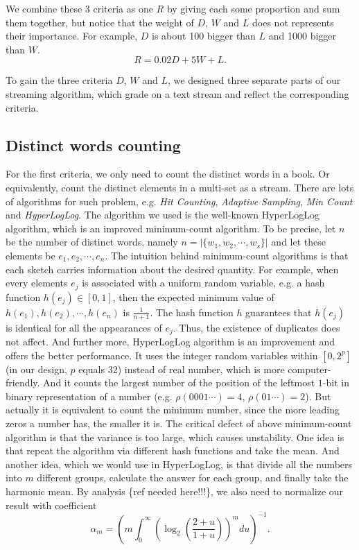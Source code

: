 \documentclass{article}
\begin{document}
	We combine these 3 criteria as one $R$ by giving each some proportion and sum them together, but notice that the weight of $D$, $W$ and $L$ does not represents their importance. For example, $D$ is about 100 bigger than $L$ and 1000 bigger than $W$.
	\[R = 0.02D + 5W + L.\]

	To gain the three criteria $D$, $W$ and $L$, we designed three separate parts of our streaming algorithm, which grade on a text stream and
	reflect the corresponding criteria.

	\subsection{Distinct words counting}
		For the first criteria, we only need to count the distinct words in a book. Or equivalently, count the distinct elements
		in a multi-set as a stream. There are lots of algorithms for such problem, e.g. \textit{Hit Counting}, \textit{Adaptive Sampling},
		\textit{Min Count} and \textit{HyperLogLog}.
		The algorithm we used is the well-known HyperLogLog algorithm\cite{hyper}, which is an improved
		minimum-count algorithm.
\newline
\newline
		To be precise, let $n$ be the number of distinct words,
		namely $n = | \{w_1, w_2, \cdots, w_s\} |$ and let these elements be $e_1, e_2, \cdots, e_n$.
		The intuition behind minimum-count algorithms is that each sketch carries information about the desired quantity. For example, when every
		elements $e_j$ is associated with a uniform random variable, e.g. a hash function $h(e_j) \in [0, 1]$, then the expected minimum value
		of $h(e_1), h(e_2), \cdots, h(e_n)$ is $\frac{1}{n + 1}$. The hash function $h$ guarantees that $h(e_j)$ is identical for all the
		appearances of $e_j$. Thus, the existence of duplicates does not affect.
	\newline
	\newline
		And further more, HyperLogLog algorithm is an improvement and offers the better performance. It uses the integer random variables within
		$[0, 2^p]$ (in our design, $p$ equals $32$) instead of real number, which is more computer-friendly. And it counts the largest number
		of the position of the leftmost $1$-bit in binary representation of a number (e.g. $\rho(0001\cdots) = 4$, $\rho(01\cdots) = 2$).
		But actually it is equivalent to count the minimum number, since the more leading zeros a number has, the smaller it is.
		The critical defect of above minimum-count algorithm is that the variance is too large, which causes unstability. One idea is that
		repeat the algorithm via different hash functions and take the mean. And another idea, which we would use in HyperLogLog, is that
		divide all the numbers into $m$ different groups, calculate the answer for each group, and finally take the harmonic mean.
	\newline
	\newline
		By analysis \{{\color{red}ref needed here!!!}\}, we also need to normalize our result with coefficient
		\[ \alpha_m = ( m \int_0^\infty (\log_2(\frac{2 + u}{1 + u}))^m du)^{-1}. \]
\end{document}
